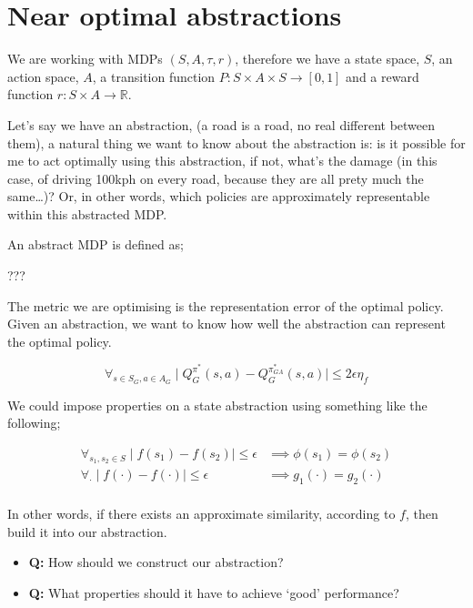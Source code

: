 
\hypertarget{near-optimal-abstractions}{%
\section{Near optimal abstractions}\label{near-optimal-abstractions}}


We are working with MDPs \((S, A, \tau, r)\), therefore we have a state
space, \(S\), an action space, \(A\), a transition function
\(P: S\times A \times S \to [0, 1]\) and a reward function
\(r: S\times A \to \mathbb R\).

Let's say we have an abstraction, (a road is a road, no real different
between them), a natural thing we want to know about the abstraction is:
is it possible for me to act optimally using this abstraction, if not,
what's the damage (in this case, of driving 100kph on every road,
because they are all prety much the same\ldots{})? Or, in other words,
which policies are approximately representable within this abstracted
MDP.

An abstract MDP is defined as;

???

The metric we are optimising is the representation error of the optimal
policy. Given an abstraction, we want to know how well the abstraction
can represent the optimal policy.

\[
\forall_{s\in S_G, a\in A_G} \mid Q_G^{\pi^* }(s, a) - Q_G^{\pi_{GA}^* }(s, a) \mid \le 2 \epsilon \eta_f
\]

We could impose properties on a state abstraction using something like
the following;


\begin{align}
\forall_{s_1, s_2 \in S} \mid f(s_1) - f(s_2)\mid \le \epsilon &\implies \phi (s_1) = \phi(s_2)\\
\forall_{\cdot} \mid f(\cdot) - f(\cdot)\mid \le \epsilon &\implies g_1(\cdot) = g_2(\cdot)\\
\end{align}


In other words, if there exists an approximate similarity, according to
\(f\), then build it into our abstraction.

\begin{itemize}
\tightlist
\item
  \textbf{Q:} How should we construct our abstraction?
\item
  \textbf{Q:} What properties should it have to achieve `good'
  performance?
\end{itemize}

